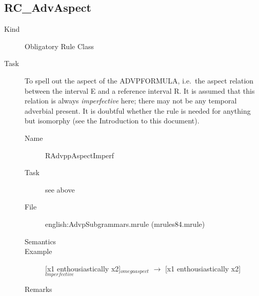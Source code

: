 \newpage
\subsection{RC\_AdvAspect}
\begin{description}
\item[Kind] Obligatory Rule Class
\item[Task] To spell out the aspect of the ADVPFORMULA, i.e.\ the aspect 
relation between the interval E and a reference interval R. It is assumed that 
this relation is always {\em imperfective\/} here; there may not be any 
temporal adverbial present. It is doubtful whether the rule is needed for 
anything but isomorphy (see the Introduction to this document).

\vspace{1 cm}
\begin{description}
\item[Name] RAdvppAspectImperf
\item[Task] see above
\item[File] english:AdvpSubgrammars.mrule (mrules84.mrule)
\item[Semantics]
\item[Example] [x1 enthousiastically x2]$_{omegaaspect}$ $\rightarrow$ 
[x1 enthousiastically x2]$_{imperfective}$ 
\item[Remarks]
\end{description}

\end{description}

\newpage
